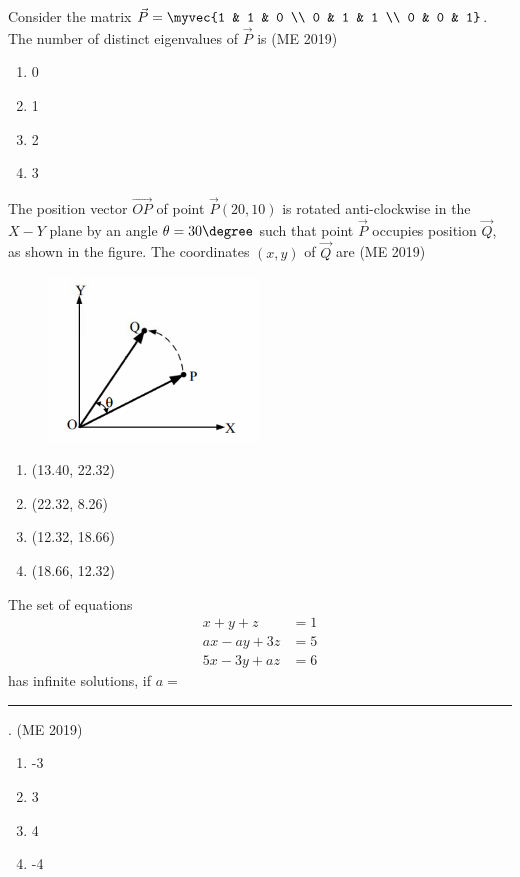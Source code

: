 \item Consider the matrix
$\vec{P} = \myvec{1 & 1 & 0 \\
                  0 & 1 & 1 \\
                  0 & 0 & 1} $.
The number of distinct eigenvalues of $ \vec{P} $ is
\hfill (ME 2019)
\begin{multicols}{4}
\begin{enumerate}
    \item 0
    \item 1
    \item 2
    \item 3
\end{enumerate}
\end{multicols}
\item The position vector $\overrightarrow{OP}$ of point $\vec{P}(20, 10)$ is rotated anti-clockwise in the $X-Y$ plane by an angle $\theta = 30\degree$ such that point $\vec{P}$ occupies position $\vec{Q}$, as shown in the figure. The coordinates $(x, y)$ of $\vec{Q}$ are
\hfill (ME 2019)
\begin{figure}[H]
\centering
\includegraphics[width=0.5\textwidth]{GATE/2019/ME/figs/Fig 5.png}
\caption{}
\label{fig:question16}
\end{figure}
\begin{multicols}{4}
\begin{enumerate}
\item (13.40, 22.32) 
\item (22.32, 8.26)  
\item (12.32, 18.66)  
\item (18.66, 12.32)  
\end{enumerate}
\end{multicols}
\item The set of equations
\begin{align*}
x + y + z &= 1 \\
ax - ay + 3z &= 5 \\
5x - 3y + az &= 6
\end{align*}
has infinite solutions, if $ a =$\rule{1cm}{0.01pt}.
\hfill (ME 2019)
\begin{multicols}{4}
\begin{enumerate}
    \item -3
    \item 3
    \item 4
    \item -4
\end{enumerate}
\end{multicols}

